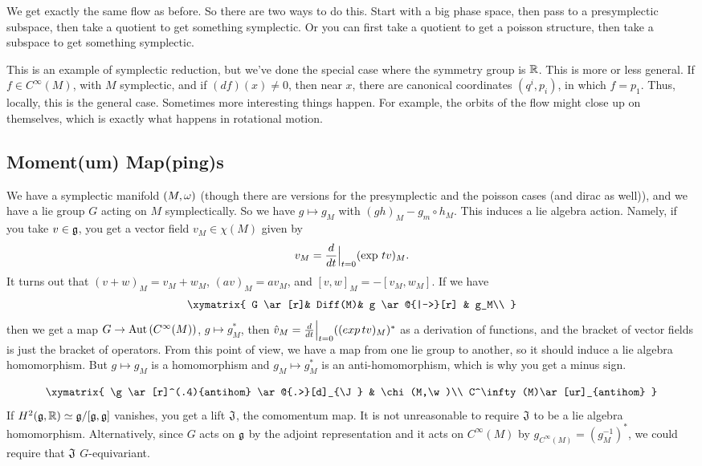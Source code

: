  We get exactly the same flow as before.  So there are two ways to
 do this.  Start with a big phase space, then pass to a
 presymplectic subspace, then take a quotient to get something
 symplectic.  Or you can first take a quotient to get a poisson
 structure, then take a subspace to get something symplectic.

 This is an example of symplectic reduction, but we've done the
 special case where the symmetry group is $\mathbb{R}$.  This is more or
 less general.  If $f\in C^\infty(M)$, with $M$ symplectic, and if
 $(df)(x)\not=0$, then near $x$, there are canonical coordinates
 $(q^i,p_i)$, in which $f=p_1$.  Thus, locally, this is the
 general case.  Sometimes more interesting things happen.  For
 example, the orbits of the flow might close up on themselves,
 which is exactly what happens in rotational motion.

 \subsection*{Moment(um) Map(ping)s}

 We have a symplectic manifold $(M,\omega)$ (though there are versions
 for the presymplectic and the poisson cases (and dirac as well)),
 and we have a lie group $G$ acting on $M$ symplectically.  So we
 have $g\mapsto g_M$ with $(gh)_M-g_m\circ h_M$.  This induces a
 lie algebra action.  Namely, if you take $v\in \mathfrak{g}$, you get a
 vector field $v_M\in \chi(M)$ given by
 \[
    v_M= \frac{d }{d t}{\Big |}_{t=0}(\exp \, tv)_M.
 \]
 It turns out that $(v+w)_M=v_M+w_M$, $(av)_M=av_M$, and
 $[v,w]_M=-[v_M,w_M]$.  If we have
 \[\xymatrix{
 G \ar[r]& Diff(M)&  g \ar@{|->}[r] & g_M\\
 }\]
 then we get a map $G\to \text{\rm Aut}\,(C^\infty(M))$, $g\mapsto g_M^*$,
 then $\hat v_M=\frac{d }{d t}{\Big |}_{t=0} ((exp\, tv)_M)^*$ as a
 derivation of functions, and the bracket of vector fields is just
 the bracket of operators.  From this point of view, we have a map
 from one lie group to another, so it should induce a lie algebra
 homomorphism.  But $g\mapsto g_M$ is a homomorphism and
 $g_M\mapsto g_M^*$ is an anti-homomorphism, which is why you get
 a minus sign.

 \[\xymatrix{
 \g \ar[r]^(.4){antihom} \ar@{.>}[d]_{\J} & \chi(M,\w)\\
 C^\infty(M)\ar[ur]_{antihom}
 }\]
 If $H^2(\mathfrak{g},\mathbb{R})\simeq \mathfrak{g}/[\mathfrak{g},\mathfrak{g}]$ vanishes, you get a lift $\mathfrak{J}$,
 the comomentum map.  It is not unreasonable to require $\mathfrak{J}$ to be
 a lie algebra homomorphism.  Alternatively, since $G$ acts on
 $\mathfrak{g}$ by the adjoint representation and it acts on $C^\infty(M)$
 by $g_{C^\infty(M)}=(g^{-1}_M)^*$, we could require that $\mathfrak{J}$
 $G$-equivariant.

